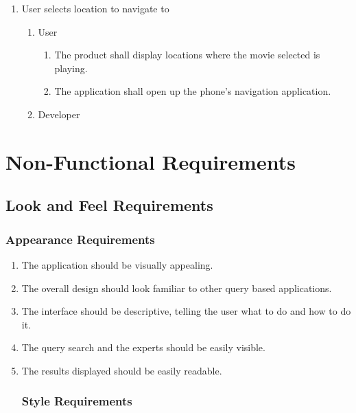 \documentclass[]{article}
\begin{document}
\begin{enumerate}[{BE}1.]
	\item User selects location to navigate to
	\begin{enumerate}[{VP3}.1]
		\item User
			\begin{enumerate}
				\item The product shall display locations where the movie selected is playing.
				\item The application shall open up the phone’s navigation application.
			\end{enumerate}
		\item Developer
	\end{enumerate}
\end{enumerate}



\section{Non-Functional Requirements} \label{nfreq}
\label{sec:non-functional_requirements}
\subsection{Look and Feel Requirements}
\label{sub:look_and_feel_requirements}

\subsubsection{Appearance Requirements}
\label{ssub:appearance_requirements}
\begin{enumerate}[{LF}1. ]
	\item The application should be visually appealing.
	\item The overall design should look familiar to other query based applications.
	\item The interface should be descriptive, telling the user what to do and how to do it.
	\item The query search and the experts should be easily visible.
	\item The results displayed should be easily readable.

\subsubsection{Style Requirements}
\label{ssub:style_requirements}
\end{enumerate}
\end{document}

